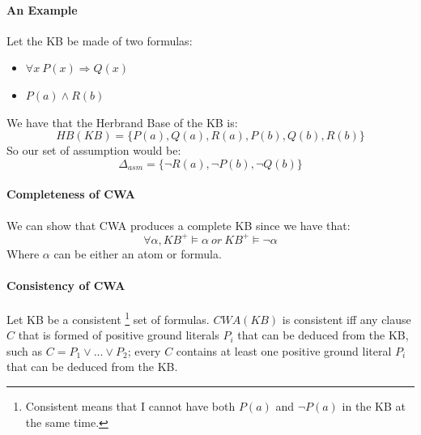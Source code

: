\documentclass[10pt,a4paper]{article}
\begin{document}
\paragraph{An Example}
Let the KB be made of two formulas:
\begin{itemize}
\item $\forall x\ P(x) \Rightarrow Q(x)$
\item $P(a)\wedge R(b)$
\end{itemize}
We have that the Herbrand Base of the KB is:
\[HB(KB)=\lbrace P(a), Q(a), R(a), P(b), Q(b), R(b) \rbrace\]
So our set of assumption would be:
\[\Delta_{asm}=\lbrace \neg R(a), \neg P(b), \neg Q(b) \rbrace\]


\paragraph{Completeness of CWA}
We can show that CWA produces a complete KB since we have that:
\[\forall \alpha, KB^+ \models \alpha\ or\ KB^+ \models \neg \alpha\]
Where $\alpha$ can be either an atom or formula. 

\paragraph{Consistency of CWA}
Let KB be a consistent \footnote{Consistent means that I cannot have both $P(a)$ and $\neg P(a)$ in the KB at the same time.} set of formulas. $CWA(KB)$ is consistent iff any clause $C$ that
is formed of positive ground literals $P_i$ that can be deduced from the KB, such as $C=P_1\vee...\vee P_2$; every $C$ contains at least one positive ground literal $P_i$ that can be deduced from the KB.
\end{document}
